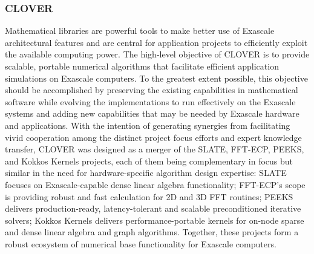 \subsubsection{ CLOVER} 
Mathematical libraries are powerful tools to make better use of Exascale 
architectural features and are central for application projects to efficiently 
exploit the available computing power. The high-level objective of CLOVER is to 
provide scalable, portable numerical algorithms that facilitate efficient 
application simulations on Exascale computers. To the greatest extent possible, 
this objective should be accomplished by preserving the existing capabilities 
in mathematical software while evolving the implementations to run effectively 
on the Exascale systems and adding new capabilities that may be needed by 
Exascale hardware and  applications. With the intention of generating synergies 
from facilitating vivid cooperation among the distinct project focus efforts 
and expert knowledge transfer, CLOVER was designed as a merger of the SLATE, 
FFT-ECP, PEEKS, and Kokkos Kernels projects, each of them being complementary 
in focus but similar in the need for hardware-specific algorithm design 
expertise: SLATE focuses on Exascale-capable dense linear algebra 
functionality; FFT-ECP’s scope is providing robust and fast calculation for 2D 
and 3D FFT routines; PEEKS delivers production-ready, latency-tolerant and 
scalable preconditioned iterative solvers; Kokkos Kernels delivers
performance-portable kernels for on-node sparse and dense linear algebra and 
graph algorithms. Together, these projects form a robust ecosystem of numerical 
base functionality for Exascale computers.
